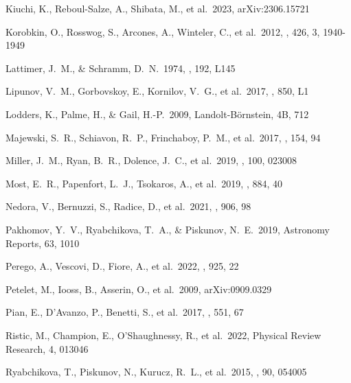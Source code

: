 \documentclass[twocolumn,twocolappendix]{aastex63}
\begin{document}
{{{{{{{{\begin{thebibliography}{}
 Kiuchi, K., Reboul-Salze, A., Shibata, M., et al.\ 2023, arXiv:2306.15721


 Korobkin, O., Rosswog, S., Arcones, A., Winteler, C., et al.\ 2012, \mnras, 426, 3, 1940-1949


 Lattimer, J.~M., \& Schramm, D.~N.\ 1974, \apjl, 192, L145


 Lipunov, V.~M., Gorbovskoy, E., Kornilov, V.~G., et al.\ 2017, \apjl, 850, L1


 Lodders, K., Palme, H., \& Gail, H.-P.\ 2009, Landolt-B\"ornstein, 4B, 712


 Majewski, S.~R., Schiavon, R.~P., Frinchaboy, P.~M., et al.\ 2017, \aj, 154, 94


 Miller, J.~M., Ryan, B.~R., Dolence, J.~C., et al.\ 2019, \prd, 100, 023008


 Most, E.~R., Papenfort, L.~J., Tsokaros, A., et al.\ 2019, \apj, 884, 40


 Nedora, V., Bernuzzi, S., Radice, D., et al.\ 2021, \apj, 906, 98


 Pakhomov, Y.~V., Ryabchikova, T.~A., \& Piskunov, N.~E.\ 2019, Astronomy Reports, 63, 1010


 Perego, A., Vescovi, D., Fiore, A., et al.\ 2022, \apj, 925, 22


 Petelet, M., Iooss, B., Asserin, O., et al.\ 2009, arXiv:0909.0329


 Pian, E., D'Avanzo, P., Benetti, S., et al.\ 2017, \nat, 551, 67


 Ristic, M., Champion, E., O'Shaughnessy, R., et al.\ 2022, Physical Review Research, 4, 013046


 Ryabchikova, T., Piskunov, N., Kurucz, R.~L., et al.\ 2015, \physscr, 90, 054005



\end{thebibliography}}}}}}}}}
\end{document}

